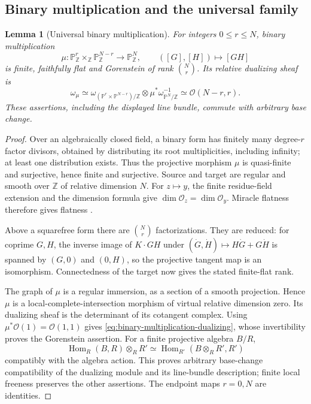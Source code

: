 \documentclass[10pt,fleqn]{article}
\numberwithin{equation}{section}
\newtheorem{lemma}[theorem]{Lemma}
\newcommand{\PP}{\mathbb P}
\begin{document}
\subsection{Binary multiplication and the universal family}

\begin{lemma}[Universal binary multiplication]\label{lem:binary-multiplication}
For integers $0\le r\le N$, binary multiplication
\[
 \mu:\PP^r_{\mathbb Z}\times_{\mathbb Z}\PP^{N-r}_{\mathbb Z}
 \longrightarrow\PP^N_{\mathbb Z},\qquad([G],[H])\longmapsto[GH]
\]
is finite, faithfully flat and Gorenstein of rank $\binom Nr$.  Its relative
dualizing sheaf is
\begin{equation}\label{eq:binary-multiplication-dualizing}
 \omega_\mu\simeq
 \omega_{(\PP^r\times\PP^{N-r})/\mathbb Z}
 \otimes\mu^*\omega_{\PP^N/\mathbb Z}^{-1}
 \simeq\mathcal O(N-r,r).
\end{equation}
These assertions, including the displayed line bundle, commute with arbitrary base change.
\end{lemma}

\begin{proof}
Over an algebraically closed field, a binary form has finitely many
degree-$r$ factor divisors, obtained by distributing its root
multiplicities, including infinity; at least one distribution exists.
Thus the projective morphism $\mu$ is quasi-finite and surjective,
hence finite and surjective.  Source and target are regular and smooth
over $\mathbb Z$ of relative dimension $N$.  For $z\mapsto y$, the
finite residue-field extension and the dimension formula give
$\dim\mathcal O_z=\dim\mathcal O_y$.  Miracle flatness therefore
gives flatness \cite[Tag~00R4]{Stacks}.

Above a squarefree form there are $\binom Nr$ factorizations.  They are
reduced: for coprime $G,H$, the inverse image of $K\cdot GH$ under
$(\dot G,\dot H)\mapsto H\dot G+G\dot H$ is spanned by $(G,0)$
and $(0,H)$, so the projective tangent map is an isomorphism.
Connectedness of the target now gives the stated finite-flat rank.

The graph of $\mu$ is a regular immersion, as a section of a smooth
projection.  Hence $\mu$ is a local-complete-intersection morphism
of virtual relative dimension zero.  Its dualizing sheaf is the
determinant of its cotangent complex.  Using
$\mu^*\mathcal O(1)=\mathcal O(1,1)$ gives
\eqref{eq:binary-multiplication-dualizing}, whose invertibility proves
the Gorenstein assertion.  For a finite projective algebra $B/R$,
\[
 \operatorname{Hom}_R(B,R)\otimes_R R'
 \simeq\operatorname{Hom}_{R'}(B\otimes_R R',R')
\]
compatibly with the algebra action.  This proves arbitrary base-change
compatibility of the dualizing module and its line-bundle description;
finite local freeness preserves the other assertions.  The endpoint
maps $r=0,N$ are identities.
\end{proof}
\end{document}
